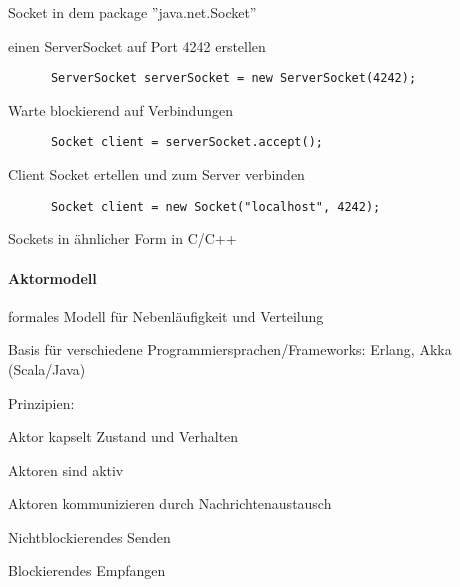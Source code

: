 \documentclass[10pt]{article}
\begin{document}
Socket in dem package ''java.net.Socket''
\begin{itemize*}
  \item einen ServerSocket auf Port 4242 erstellen
  \begin{lstlisting} 
      ServerSocket serverSocket = new ServerSocket(4242); 
    \end{lstlisting}
  \item Warte blockierend auf Verbindungen
  \begin{lstlisting} 
      Socket client = serverSocket.accept(); 
    \end{lstlisting}
  \item Client Socket ertellen und zum Server verbinden
  \begin{lstlisting} 
      Socket client = new Socket("localhost", 4242); 
    \end{lstlisting}
  \item Sockets in ähnlicher Form in C/C++
\end{itemize*}

\paragraph{Aktormodell}
\begin{itemize*}
  \item formales Modell für Nebenläufigkeit und Verteilung
  \item Basis für verschiedene Programmiersprachen/Frameworks: Erlang, Akka (Scala/Java)
  \item Prinzipien:
  \begin{itemize*}
    \item Aktor kapselt Zustand und Verhalten
    \item Aktoren sind aktiv
    \item Aktoren kommunizieren durch Nachrichtenaustausch
    \begin{itemize*}
      \item Nichtblockierendes Senden
      \item Blockierendes Empfangen
    \end{itemize*}
  \end{itemize*}
\end{itemize*}
\end{document}
